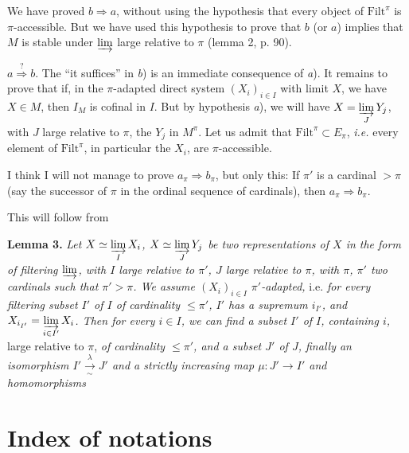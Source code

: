 \documentclass[11pt]{article}
\newcommand{\printedpage}[1]{\marginpar{\footnotesize p.~#1}}
\newcommand{\msp}[1]{\marginpar{\footnotesize [#1]}}
\begin{document}
We have proved $b\Longrightarrow a$, without using the hypothesis that every object of $\mathrm{Filt}^\pi$ is $\pi$-accessible. But we have used this hypothesis to prove that $b$ (or $a$) implies that $M$ is stable under $\varinjlim$ large relative to $\pi$ (lemma 2, p. 90).

$a\overset{?}{\Longrightarrow} b$. The ``it suffices'' in \textit{b}) is an immediate consequence of \textit{a}). It remains to prove that if, in the $\pi$-adapted direct system $(X_i)_{i\in I}$ with limit $X$, we have $X\in M$, then $I_M$ is cofinal in $I$. But by hypothesis \textit{a}), we will have $X = \varinjlim\limits_J Y_j$, with $J$ large relative to $\pi$, the $Y_j$ in $M^\pi$. Let us admit that $\mathrm{Filt}^\pi\subset E_\pi$, \textit{i.e.} every element of $\mathrm{Filt}^\pi$, in particular the $X_i$, are $\pi$-accessible.

I think I will not manage to prove $a_\pi\Longrightarrow b_\pi$, but only this: If $\pi'$ is a cardinal $>\pi$ (say the successor of $\pi$ in the ordinal sequence of cardinals), then $a_\pi\Longrightarrow b_\pi$.

\msp{page 98}This will follow from

\textbf{Lemma 3.} \textit{Let $X\simeq\varinjlim\limits_I X_i$, $X\simeq\varinjlim\limits_J Y_j$ be two representations of $X$ in the form of filtering $\varinjlim$, with $I$ large relative to $\pi'$, $J$ large relative to $\pi$, with $\pi$, $\pi'$ two cardinals such that $\pi'>\pi$. We assume $(X_i)_{i\in I}$ $\pi'$-adapted,} i.e. \textit{for every filtering subset $I'$ of $I$ of cardinality $\le\pi'$, $I'$ has a supremum $i_{I'}$, and $X_{i_{I'}} = \varinjlim\limits_{i\in I'} X_i$. Then for every $i\in I$, we can find a subset $I'$ of $I$, containing $i$,} large relative to $\pi$, \textit{of cardinality $\le\pi'$, and a subset $J'$ of $J$, finally an isomorphism $I'\xrightarrow[\sim]{\lambda}J'$ and a strictly increasing map $\mu : J'\longrightarrow I'$ and homomorphisms}

\newpage
\printedpage{53}

\section*{Index of notations}
\end{document}
